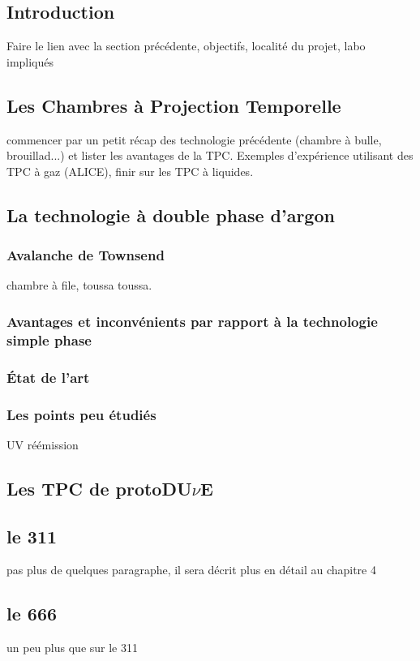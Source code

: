         \subsection{Introduction}
            Faire le lien avec la section précédente, objectifs, localité du projet, labo impliqués
    
        \subsection{Les Chambres à Projection Temporelle}
            commencer par un petit récap des technologie précédente (chambre à bulle, brouillad...) et lister les avantages de la TPC. Exemples d'expérience utilisant des TPC à gaz (ALICE), finir sur les TPC à liquides.
        
        \subsection{La technologie à double phase d'argon}
            \subsubsection{Avalanche de Townsend}
                chambre à file, toussa toussa.
            \subsubsection{Avantages et inconvénients par rapport à la technologie simple phase}\label{sec::townsend_avalanche}
            \subsubsection{État de l'art}
            \subsubsection{Les points peu étudiés}
                UV réémission
        
        \subsection{Les TPC de protoDU$\nu$E}
            \subsection{le 311}
                pas plus de quelques paragraphe, il sera décrit plus en détail au chapitre 4
            \subsection{le 666}
                un peu plus que sur le 311